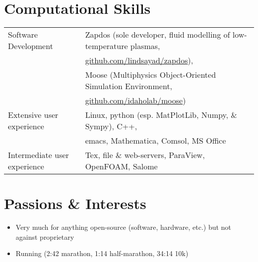 \documentclass[a4paper,10pt]{article} %
\begin{document}
\FloatBarrier


\section{Computational Skills}

\begin{tabular}{ll}

Software Development & Zapdos (sole developer, fluid modelling of low-temperature plasmas,\\
& \url{github.com/lindsayad/zapdos}),\\
& Moose (Multiphysics Object-Oriented Simulation Environment,\\
& \url{github.com/idaholab/moose})\\

Extensive user experience & Linux, python (esp. MatPlotLib, Numpy, \& Sympy), C++,\\
& emacs, Mathematica, Comsol, MS Office \\

Intermediate user experience & Tex, file \& web-servers, ParaView, OpenFOAM, Salome\\

\end{tabular}


\section{Passions \& Interests}

\begin{itemize}
  \item Very much for anything open-source (software, hardware, etc.) but not against proprietary
  \item Running (2:42 marathon, 1:14 half-marathon, 34:14 10k)
\end{itemize}

\end{document}
